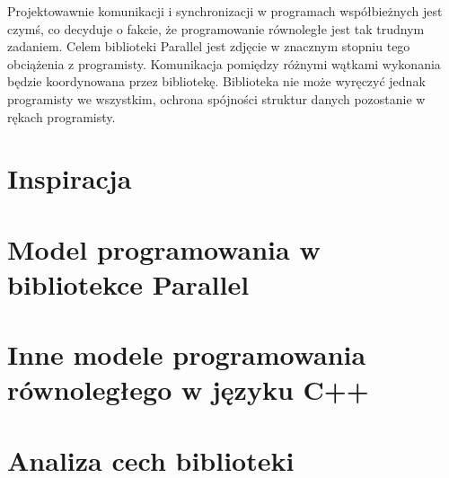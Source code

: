   Projektowawnie komunikacji i synchronizacji w programach współbieżnych jest czymś, co decyduje o fakcie, że programowanie równoległe jest tak trudnym zadaniem.
  Celem biblioteki Parallel jest zdjęcie w znacznym stopniu tego obciążenia z programisty.
  Komunikacja pomiędzy różnymi wątkami wykonania będzie koordynowana przez bibliotekę.
  Biblioteka nie może wyręczyć jednak programisty we wszystkim, ochrona spójności struktur danych pozostanie w rękach programisty.

\section{Inspiracja}

\section{Model programowania w bibliotekce Parallel}

\section{Inne modele programowania równoległego w języku C++}

\section{Analiza cech biblioteki}